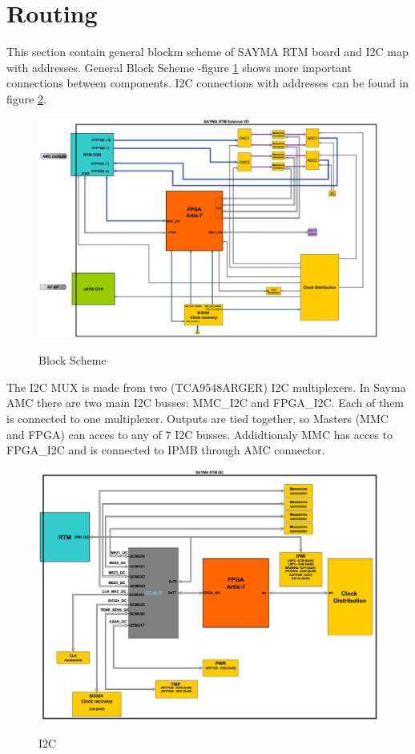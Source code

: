 \section{Routing}
This section contain general blockm scheme of SAYMA RTM board and I2C map with addresses. General Block Scheme -figure \ref{BlockScheme}
shows more important connections between components. I2C connections with addresses can be found in figure \ref{I2C}.
	\begin{figure}[htbp!]
		\centering
		\includegraphics[width=17cm]{img/sch.eps}\\
		\caption{Block Scheme} \label{BlockScheme}
	\end{figure}
\clearpage
The I2C MUX is made from two (TCA9548ARGER)  I2C multiplexers. In Sayma AMC there are two main I2C busses: MMC\_I2C and FPGA\_I2C. Each of them is connected to one multiplexer. Outputs are tied together, so Masters (MMC and FPGA) can acces to any of 7 I2C busses. Addidtionaly MMC has acces to FPGA\_I2C and is connected to IPMB through AMC connector.\\  
	\begin{figure}[htbp!]
		\centering
		\includegraphics[width=17cm]{img/i2c.eps}\\
		\caption{I2C} \label{I2C}
	\end{figure}

